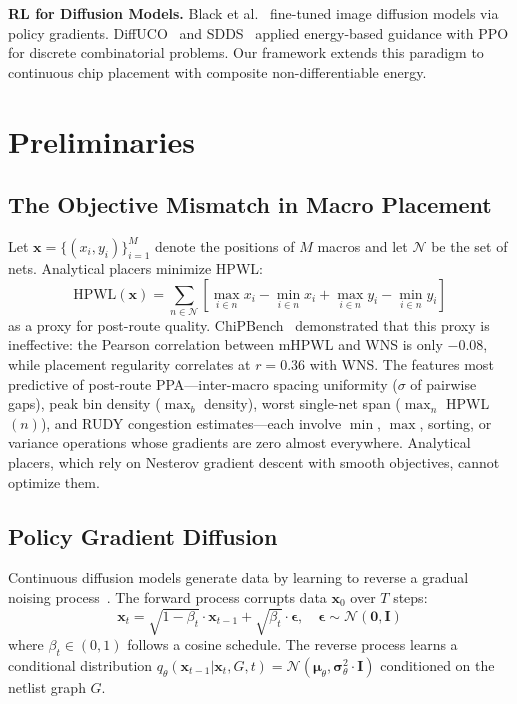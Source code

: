 \documentclass[sigconf,anonymous,review,9pt]{acmart}
\begin{document}
\textbf{RL for Diffusion Models.}
Black et al.~\cite{black2024rl} fine-tuned image diffusion models via
policy gradients. DiffUCO~\cite{sanokowski2024diffuco} and
SDDS~\cite{sanokowski2025sdds} applied energy-based guidance with PPO
for discrete combinatorial problems. Our framework extends this paradigm
to continuous chip placement with composite non-differentiable energy.


\section{Preliminaries}
\label{sec:prelim}

\subsection{The Objective Mismatch in Macro Placement}

Let $\mathbf{x} = \{(x_i, y_i)\}_{i=1}^{M}$ denote the positions of
$M$ macros and let $\mathcal{N}$ be the set of nets. Analytical placers
minimize HPWL:
\begin{equation}
\label{eq:hpwl}
\text{HPWL}(\mathbf{x}) = \sum_{n \in \mathcal{N}} \left[
\max_{i \in n} x_i - \min_{i \in n} x_i
+ \max_{i \in n} y_i - \min_{i \in n} y_i \right]
\end{equation}
as a proxy for post-route quality. ChiPBench~\cite{chipbench2025}
demonstrated that this proxy is ineffective: the Pearson correlation
between mHPWL and WNS is only $-0.08$, while placement regularity
correlates at $r = 0.36$ with WNS. The features most predictive of
post-route PPA---inter-macro spacing uniformity ($\sigma$ of pairwise
gaps), peak bin density ($\max_b$ density), worst single-net span
($\max_{n}$ HPWL$(n)$), and RUDY congestion estimates---each involve
$\min$, $\max$, sorting, or variance operations whose gradients are
zero almost everywhere. Analytical placers, which rely on Nesterov
gradient descent with smooth objectives, cannot optimize them.

\subsection{Policy Gradient Diffusion}

Continuous diffusion models generate data by learning to reverse a
gradual noising process~\cite{sanokowski2025sdds}. The forward process
corrupts data $\mathbf{x}_0$ over $T$ steps:
\begin{equation}
\label{eq:forward}
\mathbf{x}_t = \sqrt{1 - \beta_t} \cdot \mathbf{x}_{t-1}
+ \sqrt{\beta_t} \cdot \boldsymbol{\epsilon}, \quad
\boldsymbol{\epsilon} \sim \mathcal{N}(\mathbf{0}, \mathbf{I})
\end{equation}
where $\beta_t \in (0, 1)$ follows a cosine schedule. The reverse
process learns a conditional distribution
$q_\theta(\mathbf{x}_{t-1} | \mathbf{x}_t, G, t) =
\mathcal{N}(\boldsymbol{\mu}_\theta, \boldsymbol{\sigma}^2_\theta
\cdot \mathbf{I})$
conditioned on the netlist graph $G$.
\end{document}
